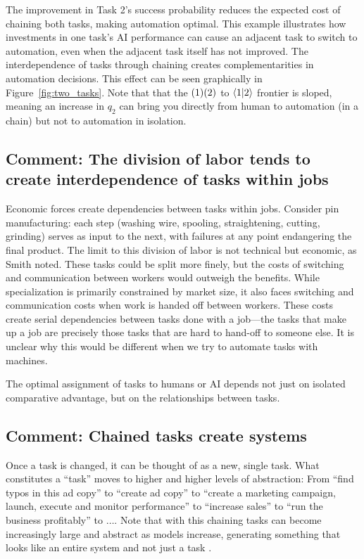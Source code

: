 \documentclass{article}
\begin{document}
The improvement in Task 2's success probability reduces the expected cost of chaining both tasks, making automation optimal.
This example illustrates how investments in one task's AI performance can cause an adjacent task to switch to automation, even when the adjacent task itself has not improved. 
The interdependence of tasks through chaining creates complementarities in automation decisions.
This effect can be seen graphically in Figure~\ref{fig:two_tasks}.
Note that that the $( 1 )( 2 )$ to $\langle 1|2 \rangle$ frontier is sloped, meaning an increase in $q_2$ can bring you directly from human to automation (in a chain) but not to automation in isolation.

\begin{tcolorbox}
  \subsection{Comment: The division of labor tends to create interdependence of tasks within jobs}
  Economic forces create dependencies between tasks within jobs. 
  Consider pin manufacturing: each step (washing wire, spooling, straightening, cutting, grinding) serves as input to the next, with failures at any point endangering the final product. 
  The limit to this division of labor is not technical but economic, as Smith noted.
  These tasks could be split more finely, but the costs of switching and communication between workers would outweigh the benefits.
  While specialization is primarily constrained by market size, it also faces switching and communication costs when work is handed off between workers. 
  These costs create serial dependencies between tasks done with a job---the tasks that make up a job are precisely those tasks that are hard to hand-off to someone else. 
  It is unclear why this would be different when we try to automate tasks with machines.
\end{tcolorbox}

The optimal assignment of tasks to humans or AI depends not just on isolated comparative advantage, but on the relationships between tasks.

\begin{tcolorbox}
\subsection{Comment: Chained tasks create systems}
Once a task is changed, it can be thought of as a new, single task.
What constitutes a ``task'' moves to higher and higher levels of abstraction: 
From ``find typos in this ad copy'' to ``create ad copy'' to ``create a marketing campaign, launch, execute and monitor performance'' to ``increase sales'' to ``run the business profitably'' to $\ldots$.  
Note that with this chaining tasks can become increasingly large and abstract as models increase, generating something that looks like an entire system and not just a task \cite{bresnahan2020artificial}.
\end{tcolorbox}
\end{document}

